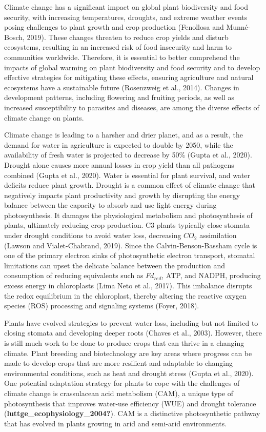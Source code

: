 \documentclass[
  12pt,
  letterpaper,
  DIV=11,
  numbers=noendperiod]{scrartcl}
\begin{document}
Climate change has a significant impact on global plant biodiversity and
food security, with increasing temperatures, droughts, and extreme
weather events posing challenges to plant growth and crop production
(Fenollosa and Munné-Bosch, 2019). These changes threaten to reduce crop
yields and disturb ecosystems, resulting in an increased risk of food
insecurity and harm to communities worldwide. Therefore, it is essential
to better comprehend the impacts of global warming on plant biodiversity
and food security and to develop effective strategies for mitigating
these effects, ensuring agriculture and natural ecosystems have a
sustainable future (Rosenzweig et al., 2014). Changes in development
patterns, including flowering and fruiting periods, as well as increased
susceptibility to parasites and diseases, are among the diverse effects
of climate change on plants.

Climate change is leading to a harsher and drier planet, and as a
result, the demand for water in agriculture is expected to double by
2050, while the availability of fresh water is projected to decrease by
50\% (Gupta et al., 2020). Drought alone causes more annual losses in
crop yield than all pathogens combined (Gupta et al., 2020). Water is
essential for plant survival, and water deficits reduce plant growth.
Drought is a common effect of climate change that negatively impacts
plant productivity and growth by disrupting the energy balance between
the capacity to absorb and use light energy during photosynthesis. It
damages the physiological metabolism and photosynthesis of plants,
ultimately reducing crop production. C3 plants typically close stomata
under drought conditions to avoid water loss, decreasing \(CO_2\)
assimilation (Lawson and Vialet-Chabrand, 2019). Since the
Calvin-Benson-Bassham cycle is one of the primary electron sinks of
photosynthetic electron transport, stomatal limitations can upset the
delicate balance between the production and consumption of reducing
equivalents such as \(Fd_{red}\), ATP, and NADPH, producing excess
energy in chloroplasts (Lima Neto et al., 2017). This imbalance disrupts
the redox equilibrium in the chloroplast, thereby altering the reactive
oxygen species (ROS) processing and signaling systems (Foyer, 2018).

Plants have evolved strategies to prevent water loss, including but not
limited to closing stomata and developing deeper roots (Chaves et al.,
2003). However, there is still much work to be done to produce crops
that can thrive in a changing climate. Plant breeding and biotechnology
are key areas where progress can be made to develop crops that are more
resilient and adaptable to changing environmental conditions, such as
heat and drought stress (Gupta et al., 2020). One potential adaptation
strategy for plants to cope with the challenges of climate change is
crassulacean acid metabolism (CAM), a unique type of photosynthesis that
improves water-use efficiency (WUE) and drought tolerance
(\textbf{luttge\_ecophysiology\_2004?}). CAM is a distinctive
photosynthetic pathway that has evolved in plants growing in arid and
semi-arid environments.
\end{document}

